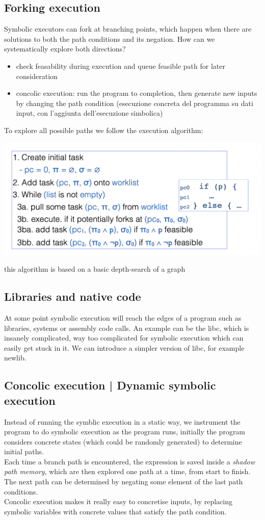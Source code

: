 \documentclass[11pt, oneside]{article}   	%
\begin{document}
\subsection*{Forking execution}
Symbolic executors can fork at branching points, which happen when there are solutions to both the path conditions and its negation. How can we systematically explore both directions?
\begin{itemize}
\item check feasability during execution and queue feasible path for later consideration
\item concolic execution: run the program to completion, then generate new inputs by changing the path condition (esecuzione concreta del programma su dati input, con l'aggiunta dell'esecuzione simbolica)
\end{itemize}
To explore all possible paths we follow the execution algorithm:
\begin{center}
\includegraphics[scale = 0.4]{dov7}
\end{center}
this algorithm is based on a basic depth-search of a graph
\subsection*{Libraries and native code}
At some point symbolic execution will reach the edges of a program such as libraries, systems or assembly code calls. An example can be the libc, which is insanely complicated, way too complicated for symbolic execution which can easily get stuck in it. We can introduce a simpler version of libc, for example newlib.

\subsection*{Concolic execution | Dynamic symbolic execution}
Instead of running the symblic execution in a static way, we instrument the program to do symbolic execution as the program runs, initially the program considers concrete states (which could be randomly generated) to determine initial paths. \\
Each time a branch path is encountered, the expression is saved inside a \emph{shadow path memory}, which are then explored one path at a time, from start to finish. The next path can be determined by negating some element of the last path conditions.\\
Concolic execution makes it really easy to concretise inputs, by replacing symbolic variables with concrete values that satisfy the path condition.
\end{document}
